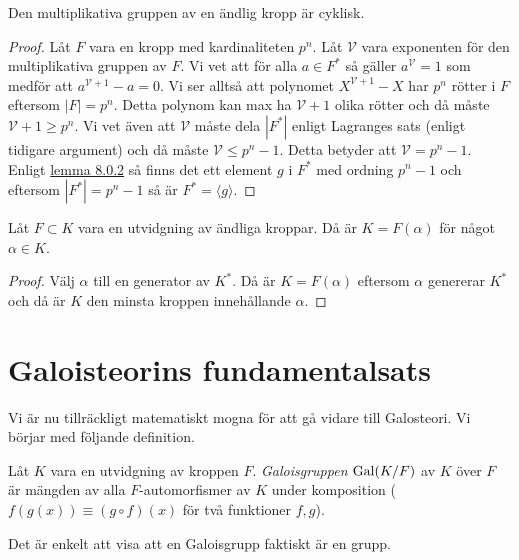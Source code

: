 \documentclass{article}
\newcommand{\gal}[0]{\textnormal{Gal}}
\theoremstyle{definition}
\begin{document}
\begin{mytheo}{}{}
  Den multiplikativa gruppen av en ändlig kropp är cyklisk. 
\end{mytheo}

\begin{proof}
  Låt $F$ vara en kropp med kardinaliteten $p^n$. Låt $\mathcal{V}$ vara exponenten för den multiplikativa gruppen av $F$. Vi vet att 
  för alla $a \in F^*$ så gäller $a^\mathcal{V} = 1$ som medför att $a^{\mathcal{V} + 1} -a = 0$. Vi ser alltså att polynomet $X^{\mathcal{V} + 1} -X$
  har $p^n$ rötter i $F$ eftersom $|F| = p^n$. Detta polynom kan max ha $\mathcal{V} + 1$ olika rötter och då måste $\mathcal{V} + 1 \geq p^n.$
  Vi vet även att $\mathcal{V}$ måste dela $|F^*|$ enligt Lagranges sats (enligt tidigare argument) och då måste $\mathcal{V} \leq p^n - 1$.
  Detta betyder att $\mathcal{V} = p^n - 1.$ Enligt \hyperlink{lemma8.0.2}{lemma 8.0.2} så finns det ett element $g$ i $F^*$ med ordning $p^n -1$
  och eftersom $|F^*| = p^n -1$ så är $F^* = \langle g \rangle$.
\end{proof}

\begin{mykol}{}{}
  Låt $F \subset K$ vara en utvidgning av ändliga kroppar. Då är $K = F(\alpha)$ för något $\alpha \in K$.
\end{mykol}

\begin{proof}
  Välj $\alpha$ till en generator av $K^*$. Då är $K = F(\alpha)$ eftersom $\alpha$ genererar $K^*$ och då är $K$ den minsta kroppen innehållande 
  $\alpha$.
\end{proof}

\section{Galoisteorins fundamentalsats}
Vi är nu tillräckligt matematiskt mogna för att gå vidare till Galosteori. Vi börjar med följande definition. 

\begin{mydef}{}{}
  Låt $K$ vara en utvidgning av kroppen $F$. \textit{Galoisgruppen} $\gal(K/F)$ av $K$ över $F$ är mängden av alla $F$-automorfismer av $K$
  under komposition ($f(g(x)) \equiv (g \circ f)(x)$ för två funktioner $f, g$).
\end{mydef}

Det är enkelt att visa att en Galoisgrupp faktiskt är en grupp.
\end{document}
